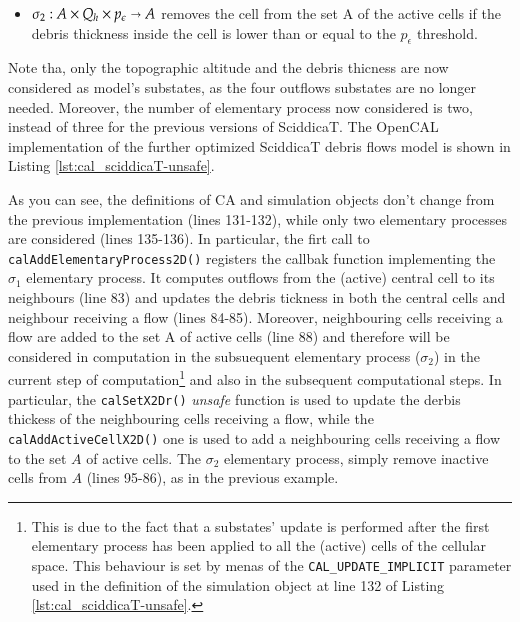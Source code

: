 \begin{itemize}
\begin{itemize}
\item $\sigma_2: A \times Q_h \times p_\epsilon \shortrightarrow A$ removes the
  cell from the set A of the active cells if the debris thickness
  inside the cell is lower than or equal to the $p_\epsilon$
  threshold.


\end{itemize}
\end{itemize}

Note tha, only the topographic altitude and the debris thicness are
now considered as model's substates, as the four outflows substates
are no longer needed. Moreover, the number of elementary process now
considered is two, instead of three for the previous versions of
SciddicaT. The OpenCAL implementation of the further optimized
SciddicaT debris flows model is shown in Listing
\ref{lst:cal_sciddicaT-unsafe}.



As you can see, the definitions of CA and simulation objects don't
change from the previous implementation (lines 131-132), while only
two elementary processes are considered (lines 135-136). In
particular, the firt call to \verb'calAddElementaryProcess2D()'
registers the callbak function implementing the $\sigma_1$ elementary
process. It computes outflows from the (active) central cell to its
neighbours (line 83) and updates the debris tickness in both the
central cells and neighbour receiving a flow (lines 84-85). Moreover,
neighbouring cells receiving a flow are added to the set A of active
cells (line 88) and therefore will be considered in computation in the
subsuequent elementary process ($\sigma_2$) in the current step of
computation\footnote{This is due to the fact that a substates' update
  is performed after the first elementary process has been applied to
  all the (active) cells of the cellular space. This behaviour is set
  by menas of the \texttt{CAL\_UPDATE\_IMPLICIT} parameter used in the
  definition of the simulation object at line 132 of Listing
  \ref{lst:cal_sciddicaT-unsafe}.} and also in the subsequent
computational steps. In particular, the \verb'calSetX2Dr()'
\emph{unsafe} function is used to update the derbis thickess of the
neighbouring cells receiving a flow, while the
\verb'calAddActiveCellX2D()' one is used to add a neighbouring cells
receiving a flow to the set $A$ of active cells.  The $\sigma_2$
elementary process, simply remove inactive cells from $A$ (lines
95-86), as in the previous example.


